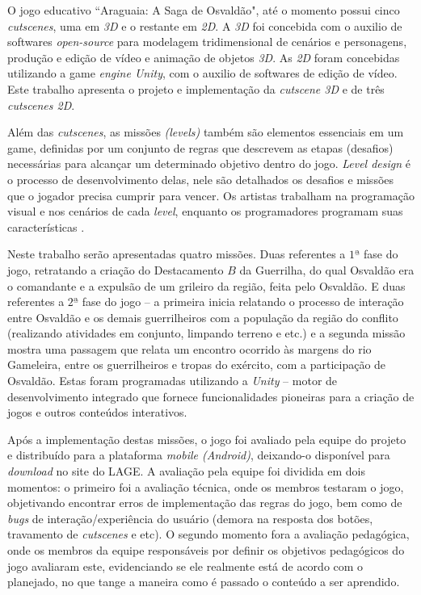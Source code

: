 O jogo educativo ``Araguaia: A Saga de Osvaldão", até o momento possui cinco \textit{cutscenes}, uma em \textit{3D} e o restante em \textit{2D}. A \textit{3D} foi concebida com o auxilio de softwares \textit{open-source} para modelagem tridimensional de cenários e personagens, produção e edição de vídeo e animação de objetos \textit{3D}. As \textit{2D} foram concebidas utilizando a game \textit{engine Unity}, com o auxilio de softwares de edição de vídeo. Este trabalho apresenta o projeto e implementação da \textit{cutscene 3D} e de três \textit{cutscenes 2D}.

Além das \textit{cutscenes}, as missões \textit{(levels)} também são elementos essenciais em um game, definidas por um conjunto de regras que descrevem as etapas (desafios) necessárias para alcançar um determinado objetivo dentro do jogo. \textit{Level design} é o processo de desenvolvimento delas, nele são detalhados os desafios e missões que o jogador precisa cumprir para vencer. Os artistas trabalham na programação visual e nos cenários de cada \textit{level}, enquanto os programadores programam suas características \cite{bib:ribeiro2013}.

Neste trabalho serão apresentadas quatro missões. Duas referentes a $1ª$ fase do jogo, retratando a criação do Destacamento $B$ da Guerrilha, do qual Osvaldão era o comandante e a expulsão de um grileiro da região, feita pelo Osvaldão. E duas referentes a $2ª$ fase do jogo -- a primeira inicia relatando o processo de interação entre Osvaldão e os demais guerrilheiros com a população da região do conflito (realizando atividades em conjunto, limpando terreno e etc.) e a segunda missão mostra uma passagem que relata um encontro ocorrido às margens do rio Gameleira, entre os guerrilheiros e tropas do exército, com a participação de Osvaldão. Estas foram programadas utilizando a \textit{Unity} -- motor de desenvolvimento integrado que fornece funcionalidades pioneiras para a criação de jogos e outros conteúdos interativos.

Após a implementação destas missões, o jogo foi avaliado pela equipe do projeto e distribuído para a plataforma \textit{mobile (Android)}, deixando-o disponível para \textit{download} no site do LAGE. A avaliação pela equipe foi dividida em dois momentos: o primeiro foi a avaliação técnica, onde os membros testaram o jogo, objetivando encontrar erros de implementação das regras do jogo, bem como de \textit{bugs} de interação/experiência do usuário (demora na resposta dos botões, travamento de \textit{cutscenes} e etc). O segundo momento fora a avaliação pedagógica, onde os membros da equipe responsáveis por definir os objetivos pedagógicos do jogo avaliaram este, evidenciando se ele realmente está de acordo com o planejado, no que tange a maneira como é passado o conteúdo a ser aprendido.


